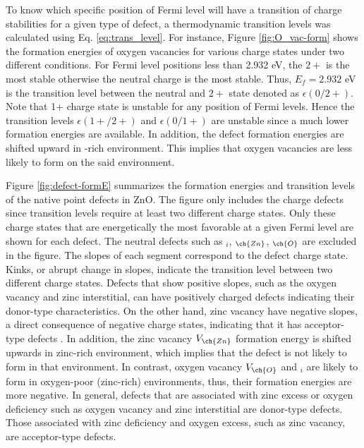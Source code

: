To know which specific position of Fermi level will have a transition of charge stabilities for a given type of defect, a thermodynamic transition levels was calculated using Eq. \eqref{eq:trans_level}. For instance, Figure \ref{fig:O_vac-form} shows the formation energies of oxygen vacancies for various charge states under two different conditions. For Fermi level positions less than 2.932 eV, the $2+$ is the most stable otherwise the neutral charge is the most stable. Thus, $E_f = 2.932$ eV is the transition level between the neutral and $2+$ state denoted as $\epsilon(0/2+)$. Note that 1+ charge state is unstable for any position of Fermi levels. Hence the transition levels $\epsilon(1+/2+)$ and $\epsilon(0/1+)$ are unstable since a much lower formation energies are available. In addition, the defect formation energies are shifted upward in -rich environment. This implies that oxygen vacancies are less likely to form on the said environment. 

Figure \ref{fig:defect-formE} summarizes the formation energies and transition levels of the native point defects in ZnO. The figure only includes the charge defects since transition levels require at least two different charge states. Only these charge states that are energetically the most favorable at a given Fermi level are shown for each defect. The neutral defects such as $_i$, $_{\ch{Zn}}$, $_{\ch{O}}$ are excluded in the figure. The slopes of each segment correspond to the defect charge state. Kinks, or abrupt change in slopes, indicate the transition level between two different charge states. Defects that show positive slopes, such as the oxygen vacancy and zinc interstitial,  can have positively charged defects indicating their donor-type characteristics. On the other hand, zinc vacancy have negative slopes, a direct consequence of negative charge states, indicating that it has acceptor-type defects \citep{Oba2011}. In addition, the zinc vacancy $V_{\ch{Zn}}$ formation energy is shifted upwards in zinc-rich environment, which implies that the defect is not likely to form in that environment. In contrast, oxygen vacancy $V_{\ch{O}}$ and $_i$ are likely to form in oxygen-poor (zinc-rich) environments, thus, their formation energies are more negative. In general, defects that are associated with zinc excess or oxygen deficiency such as oxygen vacancy and zinc interstitial are donor-type defects. Those associated with zinc deficiency and oxygen excess, such as zinc vacancy, are acceptor-type defects. 

